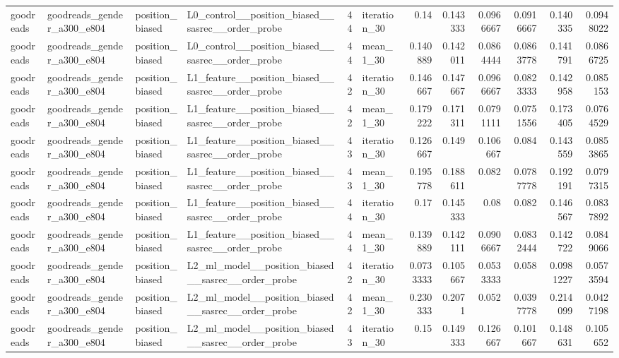 \begin{table}[htbp!]
\begin{tabular}{llllrlrrrrrr}
goodreads & goodreads\_gender\_a300\_e804 & position\_biased & L0\_control\_\_position\_biased\_\_sasrec\_\_order\_probe & 44 & iteration\_30 & 0.14 & 0.143333 & 0.0966667 & 0.0916667 & 0.140335 & 0.0948022 \\
goodreads & goodreads\_gender\_a300\_e804 & position\_biased & L0\_control\_\_position\_biased\_\_sasrec\_\_order\_probe & 44 & mean\_1\_30 & 0.140889 & 0.142011 & 0.0864444 & 0.0863778 & 0.141791 & 0.0866725 \\
goodreads & goodreads\_gender\_a300\_e804 & position\_biased & L1\_feature\_\_position\_biased\_\_sasrec\_\_order\_probe & 42 & iteration\_30 & 0.146667 & 0.147667 & 0.0966667 & 0.0823333 & 0.142958 & 0.085153 \\
goodreads & goodreads\_gender\_a300\_e804 & position\_biased & L1\_feature\_\_position\_biased\_\_sasrec\_\_order\_probe & 42 & mean\_1\_30 & 0.179222 & 0.171311 & 0.0791111 & 0.0751556 & 0.173405 & 0.0764529 \\
goodreads & goodreads\_gender\_a300\_e804 & position\_biased & L1\_feature\_\_position\_biased\_\_sasrec\_\_order\_probe & 43 & iteration\_30 & 0.126667 & 0.149 & 0.106667 & 0.084 & 0.143559 & 0.0853865 \\
goodreads & goodreads\_gender\_a300\_e804 & position\_biased & L1\_feature\_\_position\_biased\_\_sasrec\_\_order\_probe & 43 & mean\_1\_30 & 0.195778 & 0.188611 & 0.082 & 0.0787778 & 0.192191 & 0.0797315 \\
goodreads & goodreads\_gender\_a300\_e804 & position\_biased & L1\_feature\_\_position\_biased\_\_sasrec\_\_order\_probe & 44 & iteration\_30 & 0.17 & 0.145333 & 0.08 & 0.082 & 0.146567 & 0.0837892 \\
goodreads & goodreads\_gender\_a300\_e804 & position\_biased & L1\_feature\_\_position\_biased\_\_sasrec\_\_order\_probe & 44 & mean\_1\_30 & 0.139889 & 0.142111 & 0.0906667 & 0.0832444 & 0.142722 & 0.0849066 \\
goodreads & goodreads\_gender\_a300\_e804 & position\_biased & L2\_ml\_model\_\_position\_biased\_\_sasrec\_\_order\_probe & 42 & iteration\_30 & 0.0733333 & 0.105667 & 0.0533333 & 0.058 & 0.0981227 & 0.0573594 \\
goodreads & goodreads\_gender\_a300\_e804 & position\_biased & L2\_ml\_model\_\_position\_biased\_\_sasrec\_\_order\_probe & 42 & mean\_1\_30 & 0.230333 & 0.2071 & 0.052 & 0.0397778 & 0.214099 & 0.0427198 \\
goodreads & goodreads\_gender\_a300\_e804 & position\_biased & L2\_ml\_model\_\_position\_biased\_\_sasrec\_\_order\_probe & 43 & iteration\_30 & 0.15 & 0.149333 & 0.126667 & 0.101667 & 0.148631 & 0.105652 \\

\end{tabular}
\end{table}
